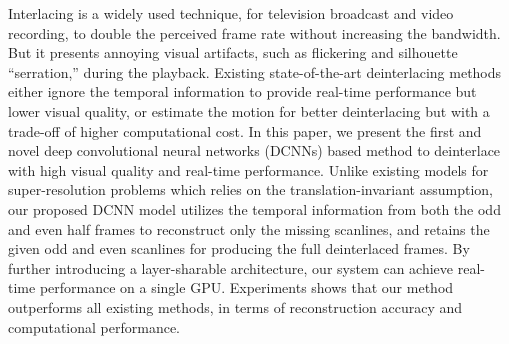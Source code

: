 Interlacing is a widely used technique, for television broadcast and video
recording, to double the perceived frame rate without increasing the bandwidth.
But it presents annoying visual artifacts, such as flickering and silhouette
``serration,''  during the playback. Existing state-of-the-art deinterlacing
methods either ignore the temporal information to provide real-time performance
but lower visual quality, or estimate the motion for better deinterlacing but
with a trade-off of higher computational cost. In this paper, we present 
the first and novel deep convolutional neural networks (DCNNs) based method to
deinterlace with high visual quality and real-time performance. Unlike existing
models for super-resolution problems which relies on the translation-invariant
assumption, our proposed DCNN model utilizes the temporal information from both
the odd and even half frames to reconstruct only the missing scanlines, and retains
the given odd and even scanlines for producing the full deinterlaced frames.
By further introducing a layer-sharable architecture, our system can achieve
real-time performance on a single GPU. Experiments shows that our
method outperforms all existing methods, in terms of 
reconstruction accuracy and computational performance.